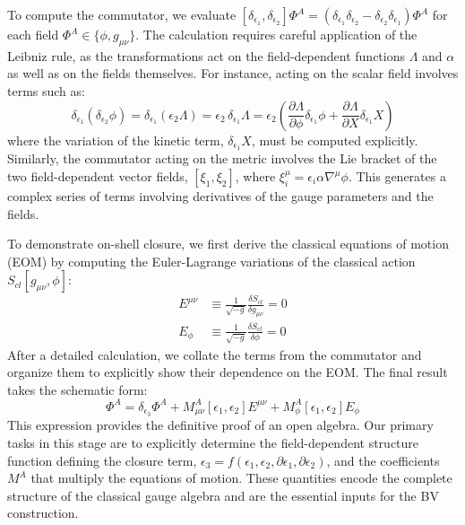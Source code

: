 \documentclass[twocolumn]{aastex631}
\begin{document}
To compute the commutator, we evaluate $[\delta_{\epsilon_1}, \delta_{\epsilon_2}] \Phi^A = (\delta_{\epsilon_1}\delta_{\epsilon_2} - \delta_{\epsilon_2}\delta_{\epsilon_1})\Phi^A$ for each field $\Phi^A \in \{\phi, g_{\mu\nu}\}$. The calculation requires careful application of the Leibniz rule, as the transformations act on the field-dependent functions $\Lambda$ and $\alpha$ as well as on the fields themselves. For instance, acting on the scalar field involves terms such as:
\begin{equation}
\delta_{\epsilon_1}(\delta_{\epsilon_2}\phi) = \delta_{\epsilon_1}(\epsilon_2 \Lambda) = \epsilon_2 \, \delta_{\epsilon_1}\Lambda = \epsilon_2 \left( \frac{\partial\Lambda}{\partial\phi}\delta_{\epsilon_1}\phi + \frac{\partial\Lambda}{\partial X}\delta_{\epsilon_1}X \right)
\end{equation}
where the variation of the kinetic term, $\delta_{\epsilon_1}X$, must be computed explicitly. Similarly, the commutator acting on the metric involves the Lie bracket of the two field-dependent vector fields, $[\xi_1, \xi_2]$, where $\xi_i^\mu = \epsilon_i \alpha \nabla^\mu \phi$. This generates a complex series of terms involving derivatives of the gauge parameters and the fields.

To demonstrate on-shell closure, we first derive the classical equations of motion (EOM) by computing the Euler-Lagrange variations of the classical action $S_{cl}[g_{\mu\nu},\phi]$:
\begin{align}
E^{\mu\nu} &\equiv \frac{1}{\sqrt{-g}} \frac{\delta S_{cl}}{\delta g_{\mu\nu}} = 0 \\
E_{\phi} &\equiv \frac{1}{\sqrt{-g}} \frac{\delta S_{cl}}{\delta \phi} = 0
\end{align}
After a detailed calculation, we collate the terms from the commutator and organize them to explicitly show their dependence on the EOM. The final result takes the schematic form:
\begin{equation}
[\delta_{\epsilon_1}, \delta_{\epsilon_2}] \Phi^A = \delta_{\epsilon_3} \Phi^A + M^A_{\mu\nu}[\epsilon_1, \epsilon_2] E^{\mu\nu} + M^A_{\phi}[\epsilon_1, \epsilon_2] E_{\phi}
\end{equation}
This expression provides the definitive proof of an open algebra. Our primary tasks in this stage are to explicitly determine the field-dependent structure function defining the closure term, $\epsilon_3 = f(\epsilon_1, \epsilon_2, \partial\epsilon_1, \partial\epsilon_2)$, and the coefficients $M^A$ that multiply the equations of motion. These quantities encode the complete structure of the classical gauge algebra and are the essential inputs for the BV construction.
\end{document}
